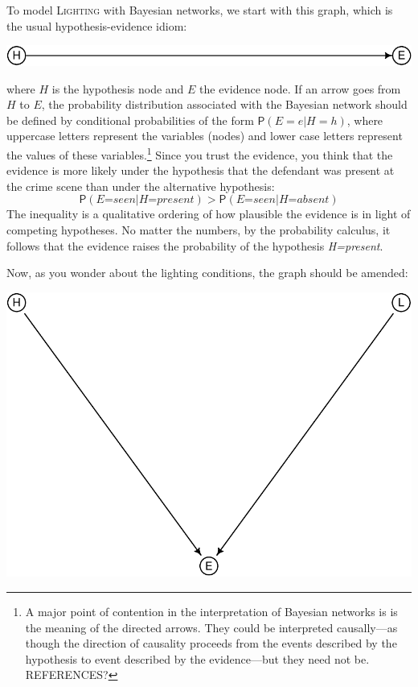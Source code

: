 \documentclass[
  11pt,
  dvipsnames,enabledeprecatedfontcommands]{scrartcl}
\newcommand{\pr}[1]{\ensuremath{\mathsf{P}(#1)}}
\begin{document}
To model \textsc{Lighting} with Bayesian networks, we start with this
graph, which is the usual hypothesis-evidence idiom:

\begin{center}\includegraphics[width=0.5\linewidth,height=0.3\textheight]{ReplyToSteeleStefansson2_files/figure-latex/heDAG-1} \end{center}

\noindent where \(H\) is the hypothesis node and \(E\) the evidence
node. If an arrow goes from \(H\) to \(E\), the probability distribution
associated with the Bayesian network should be defined by conditional
probabilities of the form \(\pr{E=e \vert H=h}\), where uppercase
letters represent the variables (nodes) and lower case letters represent
the values of these variables.\footnote{A major point of contention in
  the interpretation of Bayesian networks is is the meaning of the
  directed arrows. They could be interpreted causally---as though the
  direction of causality proceeds from the events described by the
  hypothesis to event described by the evidence---but they need not be.
  REFERENCES?} Since you trust the evidence, you think that the evidence
is more likely under the hypothesis that the defendant was present at
the crime scene than under the alternative hypothesis:
\[\pr{\textit{E=seen} \vert \textit{H=present}} > \pr{\textit{E=seen} \vert \textit{H=absent}}\]
The inequality is a qualitative ordering of how plausible the evidence
is in light of competing hypotheses. No matter the numbers, by the
probability calculus, it follows that the evidence raises the
probability of the hypothesis \textit{H=present}.

Now, as you wonder about the lighting conditions, the graph should be
amended:

\begin{center}\includegraphics[width=0.5\linewidth,height=0.1\textheight]{ReplyToSteeleStefansson2_files/figure-latex/lighting2DAG-1} \end{center}
\end{document}
